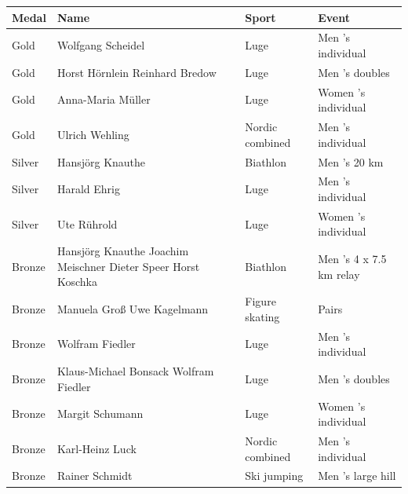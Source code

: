 \documentclass{article}
\begin{document}
\begin{tabular}{llll}
\toprule
Medal & Name & Sport & Event \\
\midrule
Gold & Wolfgang Scheidel & Luge & Men 's individual \\
Gold & Horst Hörnlein Reinhard Bredow & Luge & Men 's doubles \\
Gold & Anna-Maria Müller & Luge & Women 's individual \\
Gold & Ulrich Wehling & Nordic combined & Men 's individual \\
Silver & Hansjörg Knauthe & Biathlon & Men 's 20 km \\
Silver & Harald Ehrig & Luge & Men 's individual \\
Silver & Ute Rührold & Luge & Women 's individual \\
Bronze & Hansjörg Knauthe Joachim Meischner Dieter Speer Horst Koschka & Biathlon & Men 's 4 x 7.5 km relay \\
Bronze & Manuela Groß Uwe Kagelmann & Figure skating & Pairs \\
Bronze & Wolfram Fiedler & Luge & Men 's individual \\
Bronze & Klaus-Michael Bonsack Wolfram Fiedler & Luge & Men 's doubles \\
Bronze & Margit Schumann & Luge & Women 's individual \\
Bronze & Karl-Heinz Luck & Nordic combined & Men 's individual \\
Bronze & Rainer Schmidt & Ski jumping & Men 's large hill \\
\bottomrule
\end{tabular}
\end{document}
